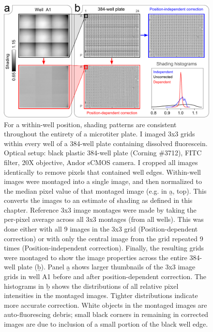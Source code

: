   \begin{figure}[!bt]
  \centering
  \includegraphics[width=6in]{FIGS/imaging/plateCorrection.pdf}
  {\singlespacing 
  \caption[ Demonstration of within-well positional image correction.]
            { For a within-well position, shading patterns are consistent
			throughout the entirety of a microtiter plate.
			I imaged 3x3 grids within every well of a 384-well
			plate containing dissolved fluorescein. Optical setup:
			black plastic 384-well plate (Corning \#3712), FITC filter,
			20X objective, Andor sCMOS camera.
			I cropped all images identically to remove pixels that contained
            well edges. Within-well images were montaged
			into a single image, and then normalized to the median pixel
			value of that montaged image (e.g. in \b{a}, top). This converts
			the images to an estimate of shading as defined in this chapter.
			Reference 3x3 image montages were
            made by taking the per-pixel average
			across all 3x3 montages (from all wells).
            This was done either with all 9 images in
			the 3x3 grid (Position-dependent correction) or with only the
			central image from the grid repeated 9 times
            (Position-independent correction).
			Finally, the resulting grids were montaged to show the image
			properties across the entire 384-well plate (\b{b}). Panel
			\b{a} shows larger thumbnails of the 3x3 image grids in well A1
			before and after position-dependent correction. The histograms
			in \b{b} shows the distributions of all relative pixel intensities
			in the montaged images. Tighter distributions indicate more
			accurate correction. White objects in the montaged images are
			auto-fluorescing debris; small black corners in remaining in
			corrected images are due to inclusion of a small portion
			of the black well edge.}
  \label{fig:imaging:plateCorrection}}
  \end{figure}



